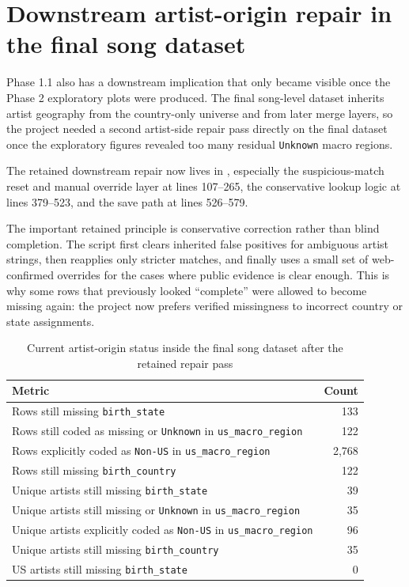 \documentclass[11pt]{article}
\begin{document}
\section{Downstream artist-origin repair in the final song dataset}
Phase 1.1 also has a downstream implication that only became visible once the
Phase 2 exploratory plots were produced. The final song-level dataset inherits
artist geography from the country-only universe and from later merge layers, so
the project needed a second artist-side repair pass directly on the final
dataset once the exploratory figures revealed too many residual
\texttt{Unknown} macro regions.

The retained downstream repair now lives in
,
especially the suspicious-match reset and manual override layer at lines
107--265, the conservative lookup logic at lines 379--523, and the save path at
lines 526--579.

The important retained principle is conservative correction rather than blind
completion. The script first clears inherited false positives for ambiguous
artist strings, then reapplies only stricter matches, and finally uses a small
set of web-confirmed overrides for the cases where public evidence is clear
enough. This is why some rows that previously looked ``complete'' were allowed
to become missing again: the project now prefers verified missingness to
incorrect country or state assignments.

\begin{table}[H]
\centering
\caption{Current artist-origin status inside the final song dataset after the retained repair pass}
\begin{tabularx}{\textwidth}{Y r}
\toprule
Metric & Count \\
\midrule
Rows still missing \texttt{birth\_state} & 133 \\
Rows still coded as missing or \texttt{Unknown} in \texttt{us\_macro\_region} & 122 \\
Rows explicitly coded as \texttt{Non-US} in \texttt{us\_macro\_region} & 2,768 \\
Rows still missing \texttt{birth\_country} & 122 \\
Unique artists still missing \texttt{birth\_state} & 39 \\
Unique artists still missing or \texttt{Unknown} in \texttt{us\_macro\_region} & 35 \\
Unique artists explicitly coded as \texttt{Non-US} in \texttt{us\_macro\_region} & 96 \\
Unique artists still missing \texttt{birth\_country} & 35 \\
US artists still missing \texttt{birth\_state} & 0 \\
\bottomrule
\end{tabularx}
\end{table}
\end{document}
